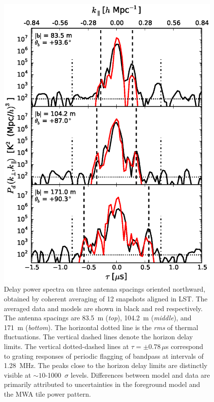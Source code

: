 \documentclass[preprint2,apjl,numberedappendix,twocolappendix,appendixfloats]{emulateapj}
\begin{document}
\begin{figure}[htb]
\centering
\includegraphics[width=\linewidth]{f2.eps}
\caption{Delay power spectra on three antenna spacings oriented northward, obtained by coherent averaging of 12 snapshots aligned in LST. The averaged data and models are shown in black and red respectively. The antenna spacings are 83.5~m ({\it top}), 104.2~m ({\it middle}), and 171~m ({\it bottom}). The horizontal dotted line is the {\it rms} of thermal fluctuations. The vertical dashed lines denote the horizon delay limits. The vertical dotted-dashed lines at $\tau = \pm 0.78\,\mu$s correspond to grating responses of periodic flagging of bandpass at intervals of 1.28~MHz. The peaks close to the horizon delay limits are distinctly visible at $\sim 10$-1000~$\sigma$ levels. Differences between model and data are primarily attributed to uncertainties in the foreground model and the MWA tile power pattern. \label{fig:3-baseline-comparison-delay-spectra}}
\end{figure}
\end{document}
